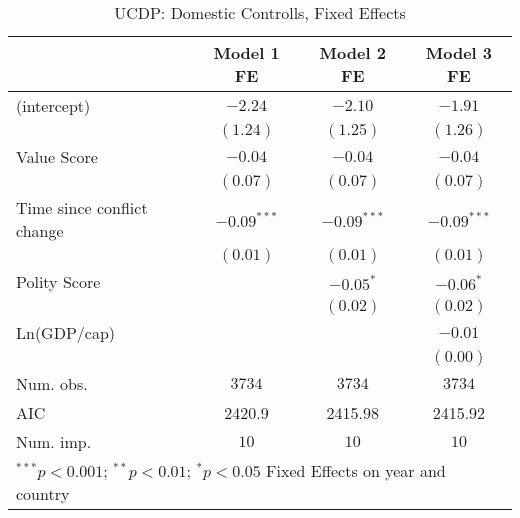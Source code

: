 
\begin{table}
\begin{center}
\begin{tabular}{l c c c}
\toprule
 & Model 1 FE & Model 2 FE & Model 3 FE \\
\midrule
(intercept)                & $-2.24$       & $-2.10$       & $-1.91$       \\
                           & $(1.24)$      & $(1.25)$      & $(1.26)$      \\
Value Score                & $-0.04$       & $-0.04$       & $-0.04$       \\
                           & $(0.07)$      & $(0.07)$      & $(0.07)$      \\
Time since conflict change & $-0.09^{***}$ & $-0.09^{***}$ & $-0.09^{***}$ \\
                           & $(0.01)$      & $(0.01)$      & $(0.01)$      \\
Polity Score               &               & $-0.05^{*}$   & $-0.06^{*}$   \\
                           &               & $(0.02)$      & $(0.02)$      \\
Ln(GDP/cap)                &               &               & $-0.01$       \\
                           &               &               & $(0.00)$      \\
\midrule
Num. obs.                  & $3734$        & $3734$        & $3734$        \\
AIC                        & 2420.9        & 2415.98       & 2415.92       \\
Num. imp.                  & $10$          & $10$          & $10$          \\
\bottomrule
\multicolumn{4}{l}{\scriptsize{ $^{***}p<0.001$; $^{**}p<0.01$; $^{*}p<0.05$ 
 Fixed Effects on year and country}}
\end{tabular}
\caption{UCDP: Domestic Controlls, Fixed Effects}
\label{UCDP_1_FE}
\end{center}
\end{table}

